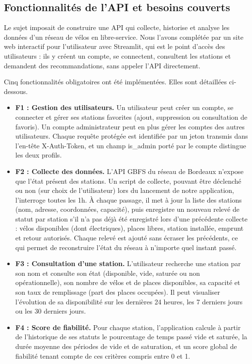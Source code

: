 \documentclass[
  french,
  11pt,
  a4paper,
]{article}
\begin{document}
\subsection{Fonctionnalités de l'API et besoins
couverts}\label{fonctionnalituxe9s-de-lapi-et-besoins-couverts}

Le sujet imposait de construire une API qui collecte, historise et
analyse les données d'un réseau de vélos en libre-service. Nous l'avons
complétée par un site web interactif pour l'utilisateur avec Streamlit,
qui est le point d'accès des utilisateurs : ils y créent un compte, se
connectent, consultent les stations et demandent des recommandations,
sans appeler l'API directement.

Cinq fonctionnalités obligatoires ont été implémentées. Elles sont
détaillées ci-dessous.

\begin{itemize}
\item
  \textbf{F1 : Gestion des utilisateurs.} Un utilisateur peut créer un
  compte, se connecter et gérer ses stations favorites (ajout,
  suppression ou consultation de favoris). Un compte administrateur peut
  en plus gérer les comptes des autres utilisateurs. Chaque requête
  protégée est identifiée par un jeton transmis dans l'en-tête
  X-Auth-Token, et un champ is\_admin porté par le compte distingue les
  deux profils.
\item
  \textbf{F2 : Collecte des données.} L'API GBFS du réseau de Bordeaux
  n'expose que l'état présent des stations. Un script de collecte,
  pouvant être déclenché ou non (sur choix de l'utilisateur) lors du
  lancement de notre application, l'interroge toutes les 1h. À chaque
  passage, il met à jour la liste des stations (nom, adresse,
  coordonnées, capacité), puis enregistre un nouveau relevé de statut
  par station s'il n'a pas déjà été enregistré lors d'une précédente
  collecte : vélos disponibles (dont électriques), places libres,
  station installée, emprunt et retour autorisés. Chaque relevé est
  ajouté sans écraser les précédents, ce qui permet de reconstruire
  l'état du réseau à n'importe quel instant passé.
\item
  \textbf{F3 : Consultation d'une station.} L'utilisateur recherche une
  station par son nom et consulte son état (disponible, vide, saturée ou
  non opérationnelle), son nombre de vélos et de places disponibles, sa
  capacité et son taux de remplissage (part des places occupées). Il
  peut visualiser l'évolution de sa disponibilité sur les dernières 24
  heures, les 7 derniers jours ou les 30 derniers jours.
\item
  \textbf{F4 : Score de fiabilité.} Pour chaque station, l'application
  calcule à partir de l'historique de ses statuts le pourcentage de
  temps passé vide et saturée, la durée moyenne des périodes de vide et
  de saturation, et un score global de fiabilité tenant compte de ces
  critères compris entre 0 et 1.
\end{itemize}
\end{document}
